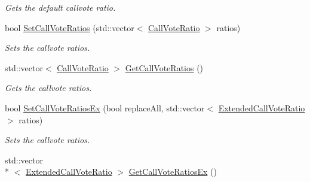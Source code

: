 \begin{DoxyCompactItemize}
\begin{DoxyCompactList}\small\item\em Gets the default callvote ratio. \end{DoxyCompactList}\item 
bool \hyperlink{classMethods_adbc7a7e788ffa66a45809c7e454dabab}{Set\-Call\-Vote\-Ratios} (std\-::vector$<$ \hyperlink{structCallVoteRatio}{Call\-Vote\-Ratio} $>$ ratios)
\begin{DoxyCompactList}\small\item\em Sets the callvote ratios. \end{DoxyCompactList}\item 
\hypertarget{classMethods_a29e8bd0f4e63f4e9e3a5c91fb49c7a2b}{std\-::vector$<$ \hyperlink{structCallVoteRatio}{Call\-Vote\-Ratio} $>$ \hyperlink{classMethods_a29e8bd0f4e63f4e9e3a5c91fb49c7a2b}{Get\-Call\-Vote\-Ratios} ()}\label{classMethods_a29e8bd0f4e63f4e9e3a5c91fb49c7a2b}

\begin{DoxyCompactList}\small\item\em Gets the callvote ratios. \end{DoxyCompactList}\item 
bool \hyperlink{classMethods_a0572ff430bc8be89035033fe17d8486a}{Set\-Call\-Vote\-Ratios\-Ex} (bool replace\-All, std\-::vector$<$ \hyperlink{structExtendedCallVoteRatio}{Extended\-Call\-Vote\-Ratio} $>$ ratios)
\begin{DoxyCompactList}\small\item\em Sets the callvote ratios. \end{DoxyCompactList}\item 
\hypertarget{classMethods_af0d500880106e39f8e6d57751b4f2abe}{std\-::vector\\*
$<$ \hyperlink{structExtendedCallVoteRatio}{Extended\-Call\-Vote\-Ratio} $>$ \hyperlink{classMethods_af0d500880106e39f8e6d57751b4f2abe}{Get\-Call\-Vote\-Ratios\-Ex} ()}\label{classMethods_af0d500880106e39f8e6d57751b4f2abe}


\end{DoxyCompactItemize}
